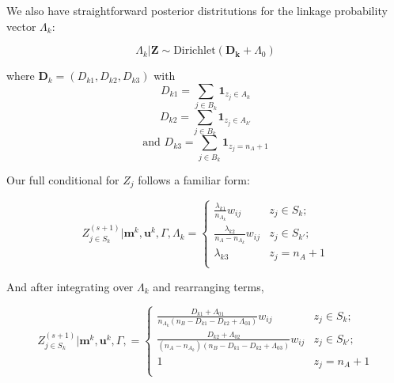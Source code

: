 \documentclass[
  12pt,
]{article}
\begin{document}
We also have straightforward posterior distritutions for the linkage
probability vector \(\Lambda_k\):

\[\Lambda_k | \mathbf{Z} \sim \text{Dirichlet}(\mathbf{D_k} + \Lambda_0)\]

where \(\mathbf{D}_k = (D_{k1}, D_{k2}, D_{k3})\) with
\[D_{k1} = \sum_{j \in B_k} \mathbf{1}_{z_j \in A_k}\]
\[D_{k2} = \sum_{j \in B_k} \mathbf{1}_{z_j \in A_{k'}}\]
\[\text{and } D_{k3} = \sum_{j \in B_k} \mathbf{1}_{z_j = n_A + 1}\]

Our full conditional for \(Z_j\) follows a familiar form:

\[Z_{j \in S_k}^{(s+1)} | \mathbf{m}^k, \mathbf{u}^k, \Gamma, \Lambda_k =
\begin{cases} 
    \frac{\lambda_{k1}}{n_{A_k}} w_{ij} & z_j \in S_k; \\
    \frac{\lambda_{k2}}{n_A - n_{A_k}} w_{ij}  & z_j \in S_{k'}; \\
     \lambda_{k3} & z_j = n_A + 1 \\
\end{cases}\]

And after integrating over \(\Lambda_k\) and rearranging terms,

\[Z_{j \in S_k}^{(s+1)} | \mathbf{m}^k, \mathbf{u}^k, \Gamma,  =
\begin{cases} 
    \frac{D_{k1} + \Lambda_{01}}{n_{A_k}(n_B - D_{k1} - D_{k2} + \Lambda_{03})} w_{ij} & z_j \in S_k; \\
    \frac{D_{k2} + \Lambda_{02}}{(n_A - n_{A_k})(n_B - D_{k1} - D_{k2} + \Lambda_{03})} w_{ij}  & z_j \in S_{k'}; \\
     1 & z_j = n_A + 1 \\
\end{cases}\]
\end{document}
